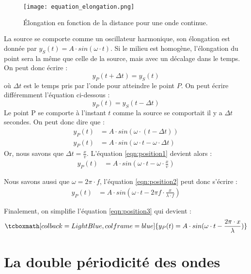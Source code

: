 \begin{figure}[h!]
    \centering
    \texttt{[image: equation\_elongation.png]}
    \caption{Élongation en fonction de la distance pour une onde continue.}
    \label{equation_elongation}
\end{figure}

La source se comporte comme un oscillateur harmonique, son élongation est donnée par  \(y_S (t)=A \cdot sin(\omega \cdot t)\).
Si le milieu est homogène, l'élongation du point sera la même que celle de la source, mais avec un décalage dans le temps. On peut donc écrire :
\begin{equation}
    y_P (t + \Delta t)   = y_S (t)
\end{equation}
où \(\Delta t\) est le temps pris par l'onde pour atteindre le point \(P\).
On peut écrire différemment l'équation ci-dessous :
\begin{equation}
    y_P (t)   = y_S (t - \Delta t)
\end{equation}
Le point P se comporte à l'instant \(t\) comme la source se comportait il y a \(\Delta t\) secondes.
On peut donc dire que :
\begin{align}
    y_P (t) & = A \cdot sin (\omega \cdot(t-\Delta t))             \\
    y_P (t) & = A \cdot sin (\omega \cdot t-\omega \cdot \Delta t)
    \label{eqn:position1}
\end{align}
Or, nous savons que \(\Delta t =\frac{x}{v}\). L'équation \ref{eqn:position1} devient alors :
\begin{align}
    y_P (t) & = A \cdot sin (\omega \cdot t-\omega \cdot \frac{x}{v})
    \label{eqn:position2}
\end{align}

Nous savons aussi que \(\omega = 2 \pi \cdot f\), l'équation \ref{eqn:position2} peut donc s'écrire :
\begin{align}
    y_P (t) & = A \cdot sin (\omega \cdot t-2 \pi f \cdot \frac{x}{\lambda \cdot f})
    \label{eqn:position3}
\end{align}

Finalement, on simplifie l'équation \ref{eqn:position3} qui devient :
\begin{equation}
    \tcboxmath[colback=LightBlue,colframe=blue]{y_P (t)= A \cdot sin (\omega \cdot t- \frac{2 \pi  \cdot x}{\lambda})}
\end{equation}

\newpage

\section{La double périodicité des ondes}
